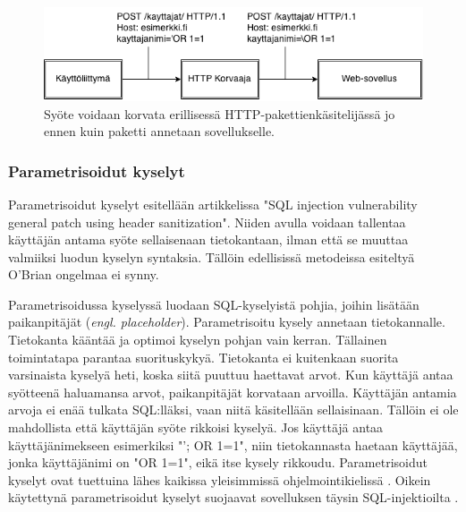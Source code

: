 \documentclass[finnish]{tktltiki2}
\theoremstyle{definition}
\theoremstyle{remark}
\begin{document}
				\begin{figure}[h!]
					\caption{Syöte voidaan korvata erillisessä HTTP-pakettienkäsitelijässä jo ennen kuin paketti annetaan sovellukselle. \cite{prepared}}
					
					
					\includegraphics[scale=0.6]{http}
				\end{figure}
		
		\subsubsection{Parametrisoidut kyselyt}
		Parametrisoidut kyselyt esitellään artikkelissa "SQL injection vulnerability general patch using header sanitization"\space \cite{prepared}. Niiden avulla voidaan tallentaa käyttäjän antama syöte sellaisenaan tietokantaan, ilman että se muuttaa valmiiksi luodun kyselyn syntaksia. Tällöin edellisissä metodeissa esiteltyä O'Brian ongelmaa ei synny.
		
		 Parametrisoidussa kyselyssä luodaan SQL-kyselyistä pohjia, joihin lisätään paikanpitäjät (\textit{engl. placeholder}). Parametrisoitu kysely annetaan tietokannalle. Tietokanta kääntää ja optimoi kyselyn pohjan vain kerran. Tällainen toimintatapa parantaa suorituskykyä. Tietokanta ei kuitenkaan suorita varsinaista kyselyä heti, koska siitä puuttuu haettavat arvot. Kun käyttäjä antaa syötteenä haluamansa arvot, paikanpitäjät korvataan arvoilla. Käyttäjän antamia arvoja ei enää tulkata SQL:lläksi, vaan niitä käsitellään sellaisinaan. Tällöin ei ole mahdollista että käyttäjän syöte rikkoisi kyselyä. Jos käyttäjä antaa käyttäjänimekseen esimerkiksi  "'; OR 1=1", niin tietokannasta haetaan käyttäjää, jonka käyttäjänimi on "OR 1=1", eikä itse kysely rikkoudu.
		Parametrisoidut kyselyt ovat tuettuina lähes kaikissa yleisimmissä ohjelmointikielissä \cite{java}. Oikein käytettynä parametrisoidut kyselyt suojaavat sovelluksen täysin SQL-injektioilta \cite{prepared}.
		
\end{document}
